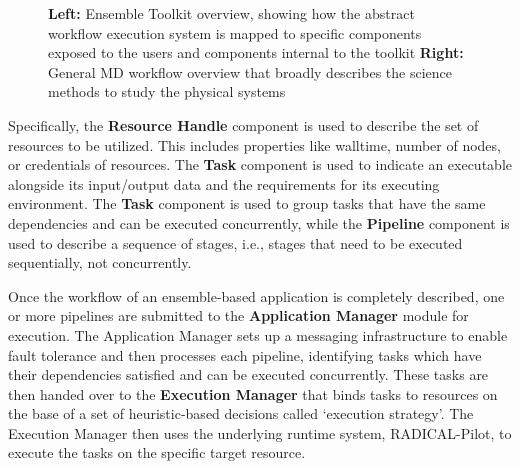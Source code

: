 \begin{figure}[!htbp]
  \centering
  \begin{minipage}[b]{0.55\textwidth}
  \centering
  \end{minipage}
  \begin{minipage}[b]{0.44\textwidth}
  \centering
  \end{minipage}
\caption{\textbf{Left:} Ensemble Toolkit overview, showing how the abstract 
workflow execution system is mapped to specific components exposed to the users
and components internal to the toolkit
\textbf{Right:} General MD workflow overview that broadly describes the science
methods to study the physical systems}
\label{fig:entk_arch}
\end{figure}

Specifically, the \textbf{Resource Handle} component is used to describe the
set of resources to be utilized. This includes properties like walltime,
number of nodes, or credentials of resources. The \textbf{Task} component is
used to indicate an executable alongside its input/output data and the
requirements for its executing environment. The \textbf{Task} component is
used to group tasks  that have the same dependencies and can be executed
concurrently, while the \textbf{Pipeline} component is used to describe a
sequence of stages, i.e., stages that need to be executed sequentially, not
concurrently.


Once the workflow of an ensemble-based application is completely described,
one or more pipelines are submitted to the \textbf{Application Manager} module
for execution. The Application Manager sets up a messaging infrastructure to
enable fault tolerance and then processes each pipeline, identifying tasks
which have their dependencies satisfied and can be executed concurrently.
These tasks are then handed over to the \textbf{Execution Manager} that binds
tasks to resources on the base of a set of heuristic-based decisions called
`execution strategy'. The Execution Manager then uses the underlying runtime
system, RADICAL-Pilot, to execute the tasks on the specific target resource.

